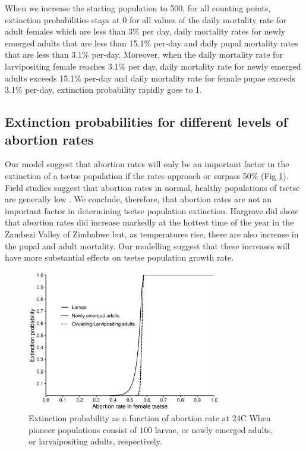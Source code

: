 \documentclass[smallextended]{svjour3}
\begin{document}
When we increase the starting population to 500, for all counting points, extinction probabilities stays at 0 for all values of the daily mortality rate for adult females which are less than 3\% per day, daily mortality rates for newly emerged adults that are less than 15.1\% per-day and daily pupal mortality rates that are less than 3.1\% per-day. Moreover, when the daily mortality rate for larvipositing  female reaches 3.1\% per day, daily mortality rate for newly emerged adults exceeds 15.1\% per-day and daily mortality rate for female pupae exceeds 3.1\% per-day, extinction probability rapidly goes to 1. 

\subsection{Extinction probabilities for different levels of abortion rates}
Our model suggest that abortion rates will only be an important factor in the extinction of a tsetse population if the rates approach or surpass 50\% (Fig \ref{fig:6}). Field studies suggest that abortion rates in normal, healthy populations of tsetse are generally low \cite{madubunyi1975technique,madubunyi1978relative,okiwelu1977host,okiwelu1977insemination,turner1984reproductive,hargrove1999reproductive}. We conclude, therefore, that abortion rates are not an important factor in determining tsetse population extinction. Hargrove \cite{hargrove1999reproductive} did show that abortion rates did increase markedly at the hottest time of the year in the Zambezi Valley of Zimbabwe but, as temperatures rise, there are also increase in the pupal and adult mortality. Our modelling suggest that these increases will have more substantial effects on tsetse population growth rate.    
\begin{figure}[h]
	\includegraphics[width=0.75\textwidth]{AbortionRates.eps}
	\caption{{Extinction probability as a function of abortion rate at 24\degree C} When pioneer populations consist of  $100$ larvae,  or  newly emerged adults, or larvaipositing adults, respectively.}
	\label{fig:6}       %
\end{figure}
\end{document}
